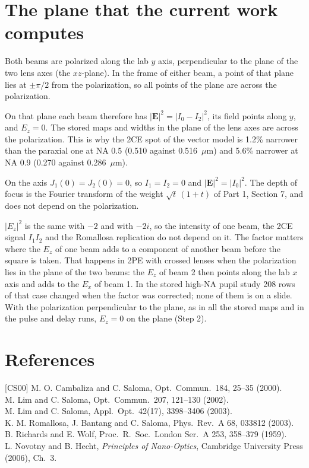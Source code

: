 \documentclass[11pt]{article}
\begin{document}
\section{The plane that the current work computes}
 Both beams are polarized along the lab $y$ axis, perpendicular to the plane of the two lens axes (the
$xz$-plane). In the frame of either beam, a point of that plane lies at $\pm\pi/2$ from the polarization, so all
points of the plane are across the polarization.

 On that plane each beam therefore has $|\mathbf E|^2 = |I_0 - I_2|^2$, its field points along $y$, and
$E_z = 0$. The stored maps and widths in the plane of the lens axes are across the polarization. This is why the 2CE
spot of the vector model is 1.2\% narrower than the paraxial one at NA 0.5 (0.510 against 0.516~$\mu$m) and 5.6\%
narrower at NA 0.9 (0.270 against 0.286~$\mu$m).

 On the axis $J_1(0) = J_2(0) = 0$, so $I_1 = I_2 = 0$ and $|\mathbf E|^2 = |I_0|^2$. The depth of focus is
the Fourier transform of the weight $\sqrt t\,(1 + t)$ of Part 1, Section 7, and does not depend on the polarization.


 $|E_z|^2$ is the same with $-2$ and with $-2i$, so the intensity of one
beam, the 2CE signal $I_1I_2$ and the Romallosa replication do not depend on it. The factor matters where the $E_z$ of
one beam adds to a component of another beam before the square is taken. That happens in 2PE with crossed lenses when
the polarization lies in the plane of the two beams: the $E_z$ of beam 2 then points along the lab $x$ axis and adds to
the $E_x$ of beam 1. In the stored high-NA pupil study 208 rows of that case changed when the factor was corrected;
none of them is on a slide. With the polarization perpendicular to the plane, as in all the stored maps and in the
pulse and delay runs, $E_z = 0$ on the plane (Step 2).

\section*{References}
\small
[CS00] M. O. Cambaliza and C. Saloma, Opt.\ Commun.\ 184, 25--35 (2000).\\
\relax[LS02] M. Lim and C. Saloma, Opt.\ Commun.\ 207, 121--130 (2002).\\
\relax[LS03] M. Lim and C. Saloma, Appl.\ Opt.\ 42(17), 3398--3406 (2003).\\
\relax[Rom03] K. M. Romallosa, J. Bantang and C. Saloma, Phys.\ Rev.\ A 68, 033812 (2003).\\
B. Richards and E. Wolf, Proc.\ R.\ Soc.\ London Ser.\ A 253, 358--379 (1959).\\
L. Novotny and B. Hecht, \emph{Principles of Nano-Optics}, Cambridge University Press (2006), Ch.~3.
\end{document}
